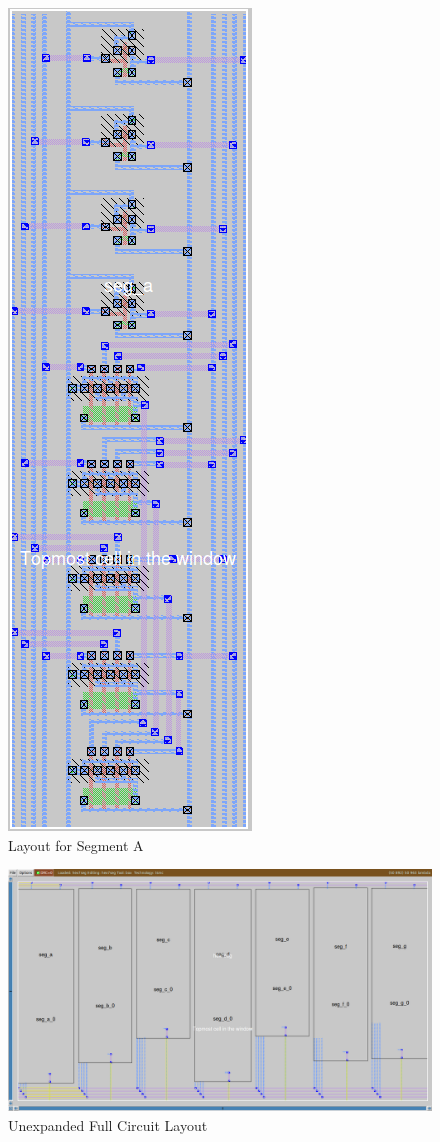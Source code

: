 \documentclass[12pt]{article}
\begin{document}
\begin{figure}[H]
	\centering
	\includegraphics[width=0.42\linewidth]{Graphics/seg_a}
	\caption{Layout for Segment A}
	\label{fig:segA_layout}
\end{figure}
\clearpage
\begin{figure}
\centering
	\includegraphics[width=\textwidth]{Graphics/hex7seg_unexpanded}
	\caption{Unexpanded Full Circuit Layout}
	\label{fig:hex7seg_unexpanded}
\end{figure}
\end{document}
